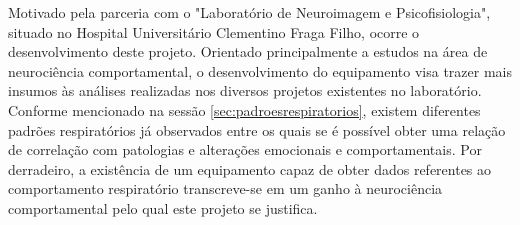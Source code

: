 	Motivado pela parceria com o "Laboratório de Neuroimagem e Psicofisiologia", situado no Hospital Universitário Clementino Fraga Filho, ocorre o desenvolvimento deste projeto. Orientado principalmente a estudos na área de neurociência comportamental, o desenvolvimento do equipamento visa trazer mais insumos às análises realizadas nos diversos projetos existentes no laboratório. Conforme mencionado na sessão \ref{sec:padroesrespiratorios}, existem diferentes padrões respiratórios já observados entre os quais se é possível obter uma relação de correlação com patologias e alterações emocionais e comportamentais. Por derradeiro, a existência de um equipamento capaz de obter dados referentes ao comportamento respiratório transcreve-se em um ganho à neurociência comportamental pelo qual este projeto se justifica.

